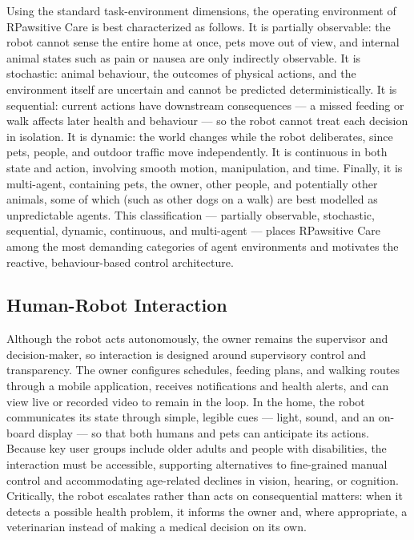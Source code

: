 \documentclass[conference,letterpaper]{IEEEtran}
\begin{document}
Using the standard task-environment dimensions, the operating environment of RPawsitive Care is best characterized as follows. It is partially observable: the robot cannot sense the entire home at once, pets move out of view, and internal animal states such as pain or nausea are only indirectly observable. It is stochastic: animal behaviour, the outcomes of physical actions, and the environment itself are uncertain and cannot be predicted deterministically. It is sequential: current actions have downstream consequences — a missed feeding or walk affects later health and behaviour — so the robot cannot treat each decision in isolation. It is dynamic: the world changes while the robot deliberates, since pets, people, and outdoor traffic move independently. It is continuous in both state and action, involving smooth motion, manipulation, and time. Finally, it is multi-agent, containing pets, the owner, other people, and potentially other animals, some of which (such as other dogs on a walk) are best modelled as unpredictable agents. This classification — partially observable, stochastic, sequential, dynamic, continuous, and multi-agent — places RPawsitive Care among the most demanding categories of agent environments and motivates the reactive, behaviour-based control architecture.

\subsection{Human-Robot Interaction}

Although the robot acts autonomously, the owner remains the supervisor and decision-maker, so interaction is designed around supervisory control and transparency. The owner configures schedules, feeding plans, and walking routes through a mobile application, receives notifications and health alerts, and can view live or recorded video to remain in the loop. In the home, the robot communicates its state through simple, legible cues — light, sound, and an on-board display — so that both humans and pets can anticipate its actions. Because key user groups include older adults and people with disabilities, the interaction must be accessible, supporting alternatives to fine-grained manual control and accommodating age-related declines in vision, hearing, or cognition. Critically, the robot escalates rather than acts on consequential matters: when it detects a possible health problem, it informs the owner and, where appropriate, a veterinarian instead of making a medical decision on its own.
\end{document}

